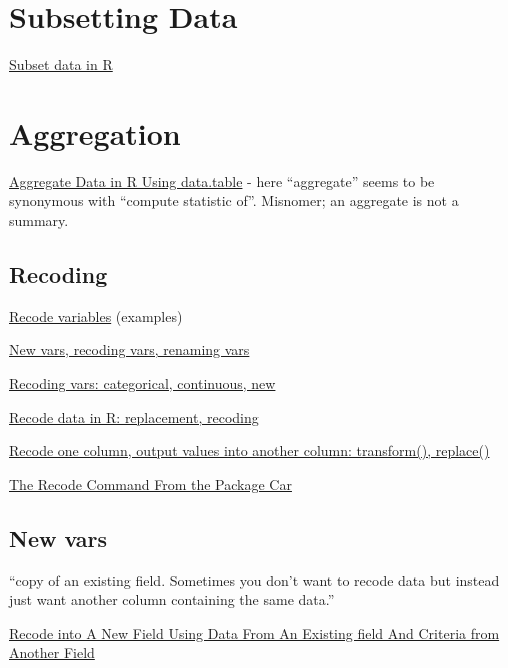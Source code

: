\documentclass[reqno,12pt]{tufte-book}
\numberwithin{equation}{subsection}
\begin{document}
\section{Subsetting Data}
\label{sect:datasubsetting}

\href{http://rprogramming.net/subset-data-in-r/}{Subset data in R}

\section{Aggregation}
\label{sect:dataaggregate}

\href{http://rprogramming.net/aggregate-data-in-r-using-data-table/}{Aggregate
  Data in R Using data.table} - here ``aggregate'' seems to be
synonymous with ``compute statistic of''.  Misnomer; an aggregate is not a summary.

\subsection{Recoding}
\label{subs:recodingr}

\href{http://www.uni-kiel.de/psychologie/rexrepos/posts/recode.html}{Recode variables} (examples)

\href{http://www.statmethods.net/management/variables.html}{New vars, recoding vars, renaming vars}

\href{http://www.cookbook-r.com/Manipulating\_data/Recoding\_data/}{Recoding vars: categorical, continuous, new}

\href{http://rprogramming.net/recode-data-in-r/}{Recode data in R: replacement, recoding}

\href{http://rwiki.sciviews.org/doku.php?id=tips:data-frames:recode_column}{Recode one column, output values into another column: transform(), replace()}

\href{http://rprogramming.net/recode-data-in-r/}{The Recode Command From the Package Car}

\subsection{New vars}
\label{subsub:newvars}

``copy of an existing field. Sometimes you don’t want to recode data but instead just want another column containing the same data.''

\href{http://rprogramming.net/recode-data-in-r/}{Recode into A New Field Using Data From An Existing field And Criteria from Another Field}
\end{document}
